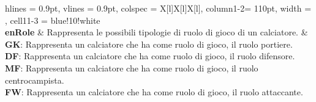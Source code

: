 \begin{tblr}{
	 hlines = {0.9pt}, vlines = {0.9pt}, colspec = {X[l]X[l]X[l]}, column{1-2}= {110pt},
    width = \textwidth, cell{1}{1-3} = {blue!10!white}
}
{	}
	\\
	{
		\textbf{enRole}
	}
	&
	{
		Rappresenta le possibili tipologie di ruolo di gioco
		di un calciatore.
	}
	&
	{
		\textbf{GK}: Rappresenta un calciatore che ha
			come ruolo di gioco, il ruolo portiere.\\
		\medskip\textbf{DF}: Rappresenta un calciatore che ha
			come ruolo di gioco, il ruolo difensore.\\
		\medskip\textbf{MF}: Rappresenta un calciatore che ha
			come ruolo di gioco, il ruolo centrocampista.\\
		\medskip\textbf{FW}: Rappresenta un calciatore che ha
			come ruolo di gioco, il ruolo attaccante.
	}
	\\
\end{tblr}

\newpage

